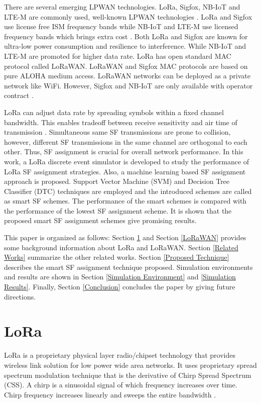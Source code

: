 \documentclass[conference]{IEEEtran}
\begin{document}
There are several emerging LPWAN technologies. LoRa, Sigfox, NB-IoT and LTE-M are commonly used, well-known LPWAN technologies \cite{7815384}. LoRa and Sigfox use license free ISM frequency bands while NB-IoT and LTE-M use licensed frequency bands which brings extra cost \cite{7815384}. Both LoRa and Sigfox are known for ultra-low power consumption and resilience to interference. While NB-IoT and LTE-M are promoted for higher data rate. LoRa has open standard MAC protocol called LoRaWAN. LoRaWAN and Sigfox MAC protocols are based on pure ALOHA medium access. LoRaWAN networks can be deployed as a private network like WiFi. However, Sigfox and NB-IoT are only available with operator contract \cite{7815384}.

LoRa can adjust data rate by spreading symbols within a fixed channel bandwidth. This enables tradeoff between receive sensitivity and air time of transmission \cite{7803607}. Simultaneous same SF transmissions are prone to collision, however, different SF transmissions in the same channel are orthogonal to each other. Thus, SF assignment is crucial for overall network performance. In this work, a LoRa discrete event simulator is developed to study the performance of LoRa SF assignment strategies. Also, a machine learning based SF assignment approach is proposed. Support Vector Machine (SVM) and Decision Tree Classifier (DTC) techniques are employed and the introduced schemes are called as smart SF schemes. The performance of the smart schemes is compared with the performance of the lowest SF assignment scheme. It is shown that the proposed smart SF assignment schemes give promising results.

This paper is organized as follows: Section \ref{LoRa} and Section \ref{LoRaWAN} provides some background information about LoRa and LoRaWAN. Section \ref{Related Works} summarize  the other related works. Section \ref{Proposed Technique} describes the smart SF assignment technique proposed. Simulation environments and results are shown in Section \ref{Simulation Environment} and \ref{Simulation Results}. Finally, Section \ref{Conclusion} concludes the paper by giving future directions.


\section{LoRa} \label{LoRa}
LoRa is a proprietary physical layer radio/chipset technology that provides wireless link solution for low power wide area networks. It uses proprietary spread spectrum modulation technique that is the derivative of Chirp Spread Spectrum (CSS). A chirp is a sinusoidal signal of which frequency increases over time. Chirp frequency increases linearly and sweeps the entire bandwidth \cite{AN1200.22}.
\end{document}
